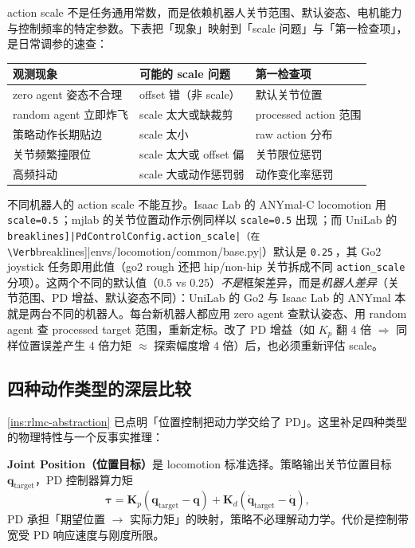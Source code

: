 action scale 不是任务通用常数，而是依赖机器人关节范围、默认姿态、电机能力与控制频率的特定参数。下表把「现象」映射到「scale 问题」与「第一检查项」，是日常调参的速查：

\begin{center}
\small
\begin{tabular}{@{}lll@{}}
\toprule
观测现象 & 可能的 scale 问题 & 第一检查项 \\
\midrule
zero agent 姿态不合理 & offset 错（非 scale） & 默认关节位置 \\
random agent 立即炸飞 & scale 太大或缺裁剪 & processed action 范围 \\
策略动作长期贴边 & scale 太小 & raw action 分布 \\
关节频繁撞限位 & scale 太大或 offset 偏 & 关节限位惩罚 \\
高频抖动 & scale 大或动作惩罚弱 & 动作变化率惩罚 \\
\bottomrule
\end{tabular}
\end{center}

\begin{pitfall}
不同机器人的 action scale 不能互抄。Isaac Lab 的 ANYmal-C locomotion 用 \verb|scale=0.5|\,\cite{isaaclab2024}；mjlab 的关节位置动作示例同样以 \verb|scale=0.5| 出现\,\cite{mjlab2026}；而 UniLab 的 \Verb[breaklines]|PdControlConfig.action_scale|（在 \Verb[breaklines]|envs/locomotion/common/base.py|）默认是 \verb|0.25|\,\cite{unilab2026}，其 Go2 joystick 任务即用此值（go2 rough 还把 hip/non-hip 关节拆成不同 \verb|action_scale| 分项）。这两个不同的默认值（$0.5$ vs $0.25$）\emph{不是}框架差异，而是\emph{机器人差异}（关节范围、PD 增益、默认姿态不同）：UniLab 的 Go2 与 Isaac Lab 的 ANYmal 本就是两台不同的机器人。每台新机器人都应用 zero agent 查默认姿态、用 random agent 查 processed target 范围，重新定标。改了 PD 增益（如 $K_p$ 翻 4 倍 $\Rightarrow$ 同样位置误差产生 4 倍力矩 $\approx$ 探索幅度增 4 倍）后，也必须重新评估 scale。
\end{pitfall}

\subsection{四种动作类型的深层比较}
\label{sec:rlmc-action-deep}

\cref{ins:rlmc-abstraction} 已点明「位置控制把动力学交给了 PD」。这里补足四种类型的物理特性与一个反事实推理：

\textbf{Joint Position（位置目标）}是 locomotion 标准选择。策略输出关节位置目标 $\mathbf q_{\text{target}}$，PD 控制器算力矩
\begin{equation}
\boldsymbol\tau = \mathbf K_p(\mathbf q_{\text{target}}-\mathbf q) + \mathbf K_d(\dot{\mathbf q}_{\text{target}}-\dot{\mathbf q}),
\label{eq:rlmc-pd}
\end{equation}
PD 承担「期望位置 $\to$ 实际力矩」的映射，策略不必理解动力学。代价是控制带宽受 PD 响应速度与刚度所限。

